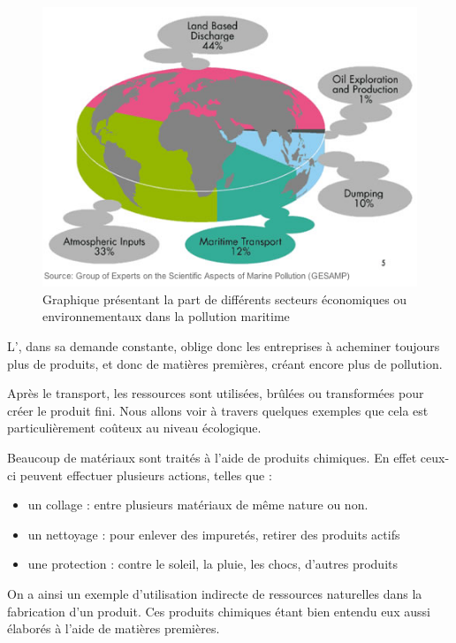 \begin{figure}[h]
\centerline{\includegraphics[scale=0.75]{Rsc/pollution_maritime.png}}
\caption{Graphique présentant la part de différents secteurs économiques ou environnementaux dans la pollution maritime}
\label{PollutionMaritime}%
\end{figure}

L'\op, dans sa demande constante, oblige donc les entreprises à acheminer toujours plus de produits, et donc de matières premières, créant encore plus de pollution.

\bigbreak Après le transport, les ressources sont utilisées, brûlées ou transformées pour créer le produit fini. Nous allons voir à travers quelques exemples que cela est particulièrement coûteux au niveau écologique.

Beaucoup de matériaux sont traités à l'aide de produits chimiques. En effet ceux-ci peuvent effectuer plusieurs actions, telles que : 
\begin{itemize}
  \item un collage : entre plusieurs matériaux de même nature ou non. 
  \item un nettoyage : pour enlever des impuretés, retirer des produits actifs
  \item une protection : contre le soleil, la pluie, les chocs, d'autres produits
\end{itemize}

On a ainsi un exemple d'utilisation indirecte de ressources naturelles dans la fabrication d'un produit. Ces produits chimiques étant bien entendu eux aussi élaborés à l'aide de matières premières. 

